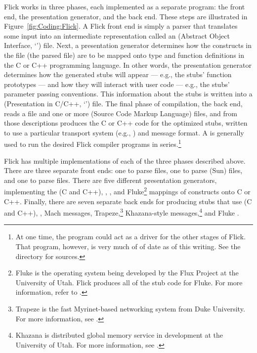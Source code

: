 Flick works in three phases, each implemented as a separate program: the front
end, the presentation generator, and the back end.  These steps are illustrated
in Figure~\ref{fig:Coding:Flick}.  A Flick front end is simply a parser that
translates some \IDL{} input into an intermediate representation called an
\AOI{} (Abstract Object Interface, `') file.  Next, a
presentation generator determines how the constructs in the \AOI{} file (the
parsed \IDL{} file) are to be mapped onto type and function definitions in the
C or C++ programming language.  In other words, the presentation generator
determines how the generated stubs will appear --- e.g., the stubs' function
prototypes --- and how they will interact with user code
--- e.g., the stubs' parameter passing conventions.  This information about the
stubs is written into a \PRESC{} (Presentation in C/C++, `')
file.  The final phase of compilation, the back end, reads a \PRESC{} file and
one or more \SCML{} (Source Code Markup Language) files, and from those
descriptions produces the C or C++ code for the optimized stubs, written to use
a particular transport system (e.g., \TCP{}) and message format.
%
A  is generally used to run the desired Flick compiler
programs in series.\footnote{At one time, the  program
could act as a driver for the other stages of Flick.  That program, however, is
very much of of date as of this writing.  See the  directory
for sources.}

Flick has multiple implementations of each of the three phases described above.
There are three separate front ends: one to parse \CORBA{} \IDL{} files, one to
parse \ONCRPC{} (Sun) \IDL{} files, and one to parse \MIG{} \IDL{} files.
There are five different presentation generators, implementing the \CORBA{} (C
and C++), \ONCRPC{}, \MIG{}, and Fluke\footnote{Fluke is the operating system
being developed by the Flux Project at the University of Utah.  Flick produces
all of the stub code for Fluke.  For more information, refer to \flukeurl{}.}
mappings of \IDL{} constructs onto C or C++\@.  Finally, there are seven
separate back ends for producing stubs that use \IIOP{} (C and C++), \ONCTCP{},
Mach messages, Trapeze,\footnote{Trapeze is the fast Myrinet-based networking
system from Duke University.  For more information, see \trapezeurl{}.}
Khazana-style messages,\footnote{Khazana is distributed global memory service
in development at the University of Utah.  For more information, see
\khazanaurl{}.}  and Fluke \IPC{}\@.


